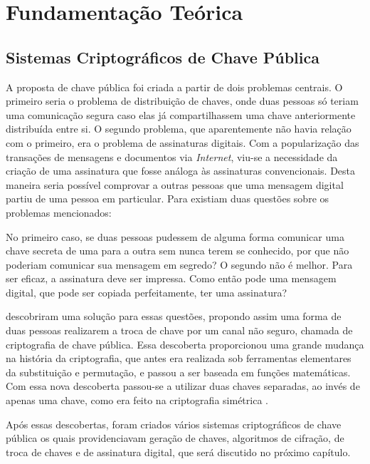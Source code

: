 \chapter[Fundamentação Teórica]{Fundamentação Teórica}
\section{Sistemas Criptográficos de Chave Pública}

A proposta de chave pública foi criada a partir de dois problemas centrais. O primeiro seria o problema de distribuição de chaves, onde duas pessoas só teriam uma comunicação segura caso elas já compartilhassem uma chave anteriormente distribuída entre si. O segundo problema, que aparentemente não havia relação com o primeiro, era o problema de assinaturas digitais. Com a popularização das transações de mensagens e documentos via \textit{Internet}, viu-se a necessidade da criação de uma assinatura que fosse análoga às assinaturas convencionais. Desta maneira seria possível comprovar a outras pessoas que uma mensagem digital partiu de uma pessoa em particular. Para  existiam duas questões sobre os problemas mencionados:

\begin{citacao}
No primeiro caso, se duas pessoas pudessem de alguma forma comunicar uma chave secreta de uma para a outra sem nunca terem se conhecido, por que não poderiam comunicar sua mensagem em segredo? O segundo não é melhor. Para ser eficaz, a assinatura deve ser impressa. Como então pode uma mensagem digital, que pode ser copiada perfeitamente, ter uma assinatura?
\end{citacao}

 descobriram uma solução para essas questões, propondo assim uma forma de duas pessoas realizarem a troca de chave por um canal não seguro, chamada de criptografia de chave pública. Essa descoberta proporcionou uma grande mudança na história da criptografia, que antes era realizada sob ferramentas elementares da substituição e permutação, e passou a ser baseada em funções matemáticas. Com essa nova descoberta passou-se a utilizar duas chaves separadas, ao invés de apenas uma chave, como era feito na criptografia simétrica \cite{stallings2014}.

Após essas descobertas, foram criados vários sistemas criptográficos de chave pública os quais providenciavam geração de chaves, algoritmos de cifração, de troca de chaves e de assinatura digital, que será discutido no próximo capítulo.

